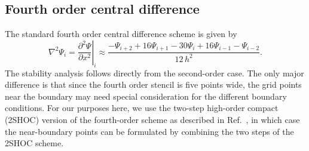 \documentclass{article}
\begin{document}
\subsection{Fourth order central difference}
\label{s:1d2shocstb}
The standard fourth order central difference scheme is given by
\begin{equation}
\label{1d4cd}
\nabla^2\Psi_i = \left. \frac{\partial^2 \Psi}{\partial x^2} \right|_i \approx \frac{-\Psi_{i+2} +16\Psi_{i+1} -30\Psi_i +16\Psi_{i-1} - \Psi_{i-2}}{12\,h^2}.
\end{equation}
The stability analysis follows directly from the second-order case.  The only major difference is that since the fourth order stencil is five points wide, the grid points near the boundary may need special consideration for the different boundary conditions.  For our purposes here, we use the two-step high-order compact (2SHOC) version of the fourth-order scheme as described in Ref.~\cite{ME_2SHOC}, in which case the near-boundary points can be formulated by combining the two steps of the 2SHOC scheme.
\end{document}
